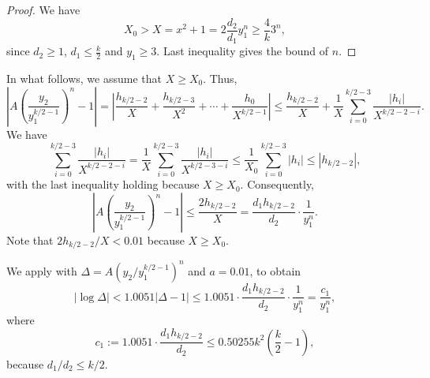 \documentclass[12pt]{amsart}
\numberwithin{equation}{section}
\theoremstyle{definition}
\theoremstyle{remark}
\begin{document}
\begin{proof}
We have
\begin{equation*}
    X_0 > X=x^2+1 = 2\frac{d_2}{d_1}y_1^n\geq \frac{4}{k} 3^n,
\end{equation*}
since $d_2\geq 1$, $d_1\leq \frac{k}{2}$ and $y_1\geq 3$. Last inequality gives the bound of $n$.
\end{proof}

In what follows, we assume that $X\ge X_0$. Thus,
\begin{equation*}
    \left|A\left(\frac{y_2}{y_1^{k/2-1}}\right)^n-1\right|
      =
    \left|\frac{h_{k/2-2}}{X} + \frac{h_{k/2-3}}{X^2} 
    +\cdots +\frac{h_0}{X^{k/2-1}}\right|
    \le \frac{h_{k/2-2}}{X}
    +\frac{1}{X}\sum_{i=0}^{k/2-3}\frac{|h_i|}{X^{k/2-2-i}}.
\end{equation*}
We have 
\begin{equation*}
\sum_{i=0}^{k/2-3}\frac{|h_i|}{X^{k/2-2-i}} =
\frac{1}{X}\sum_{i=0}^{k/2-3}\frac{|h_i|}{X^{k/2-3-i}}
\le \frac{1}{X_0}\sum_{i=0}^{k/2-3}|h_i|\le |h_{k/2-2}|,
\end{equation*}
with the last inequality holding because $X\geq X_0$. Consequently,
\begin{equation*}  
     \left|A\left(\frac{y_2}{y_1^{k/2-1}}\right)^n-1\right|
     \le  \frac{2h_{k/2-2}}{X} 
     =\frac{d_1h_{k/2-2}}{d_2}\cdot\frac{1}{y_1^n}.
\end{equation*}
Note that $2h_{k/2-2}/X<0.01$ because $X\geq X_0$.

We apply \cite[Lemma B.2]{SmartBook98} with $\Delta =A\left(y_2/y_1^{k/2-1}\right)^n$ and $a=0.01$, to obtain
%
\begin{equation} \label{eq:bnd_logDelta}
   |\log\Delta | < 1.0051|\Delta -1|\leq 1.0051\cdot
   \frac{d_1h_{k/2-2}}{d_2}\cdot\frac{1}{y_1^n} 
   =\frac{c_1}{y_1^n},
\end{equation}
where
\begin{equation}\label{eq:c1}
c_1:=1.0051\cdot\frac{d_1h_{k/2-2}}{d_2}
 \le 0.50255k^2\left(\frac{k}{2}-1\right),
\end{equation}
because $d_1/d_2\le k/2$. 
\end{document}
